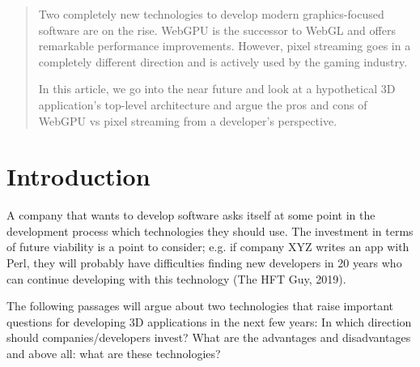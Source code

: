 \documentclass[10pt]{article}
\begin{document}
\begin{sloppypar}
  \begin{abstract}
    Two completely new technologies to develop modern graphics-focused software are on the rise. WebGPU is the successor to WebGL and offers remarkable performance improvements. However, pixel streaming goes in a completely different direction and is actively used by the gaming industry.

    In this article, we go into the near future and look at a hypothetical 3D application’s top-level architecture and argue the pros and cons of WebGPU vs pixel streaming from a developer’s perspective.
  \end{abstract}

  \pagebreak
  \tableofcontents
  \pagebreak
  \listoffigures
  \pagebreak
  \listoftables
  \pagebreak
  \lstlistoflistings
  \pagebreak


  \section{Introduction}
  \label{sec:introduction}

  A company that wants to develop software asks itself at some point in the development process which technologies they should use. The investment in terms of future viability is a point to consider; e.g. if company XYZ writes an app with Perl, they will probably have difficulties finding new developers in 20 years who can continue developing with this technology (The HFT Guy, 2019).

  The following passages will argue about two technologies that raise important questions for developing 3D applications in the next few years: In which direction should companies/developers invest? What are the advantages and disadvantages and above all: what are these technologies?


\end{sloppypar}
\end{document}
